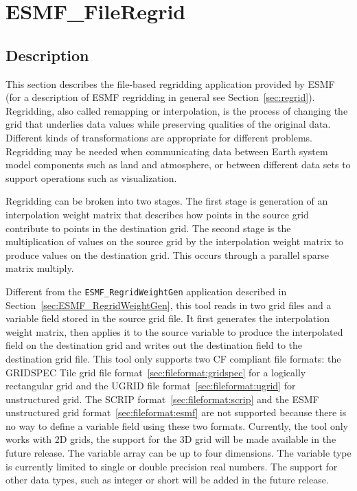 
\section{ESMF\_FileRegrid}
\label{sec:ESMF_FileRegrid}

\subsection{Description}

This section describes the file-based regridding application provided by ESMF (for a description of ESMF regridding in general see Section~\ref{sec:regrid}). Regridding, also called remapping or interpolation, is the process of changing the grid that underlies data values while preserving qualities of the original data. Different kinds of transformations are appropriate for different problems. Regridding may be needed when communicating data between Earth system model components such as land and atmosphere, or between different data sets to support operations such as visualization. 

Regridding can be broken into two stages. The first stage is generation of an interpolation weight matrix that describes how points in
the source grid contribute to points in the destination grid. The second stage is the multiplication of values on the source grid by the
interpolation weight matrix to produce values on the destination grid. This occurs through a parallel sparse matrix multiply.

Different from the {\tt ESMF\_RegridWeightGen} application described in Section~\ref{sec:ESMF_RegridWeightGen}, this tool reads in two grid files and a variable field stored in the source grid file. It first generates the interpolation weight matrix, then applies it to the source
variable to produce the interpolated field on the destination grid and writes out the destination
field to the destination grid file.  This tool only
supports two CF compliant file formats: the GRIDSPEC Tile grid file format~\ref{sec:fileformat:gridspec} for
a logically rectangular grid and the UGRID file format~\ref{sec:fileformat:ugrid} for unstructured grid.  
The SCRIP format~\ref{sec:fileformat:scrip} and the ESMF unstructured grid format~\ref{sec:fileformat:esmf} are not supported because there is no way to define a variable field using these two formats. Currently, the tool only works with 2D grids, the support for the 3D grid will be 
made available in the future release.  The variable array can be up to four dimensions.  The
variable type is currently limited to single or double precision real numbers.  The support for 
other data types, such as integer or short will be added in the future release.  

